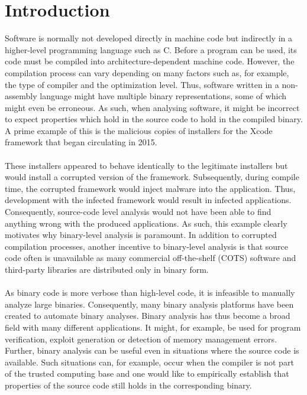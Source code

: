 \documentclass{kththesis}
\newcommand{\fbcomment}[1]{{#1}}
\renewcommand{\fbcomment}[1]{}
\begin{document}
\chapter{Introduction}
\fbcomment{\color{red}Goal: Introduce the reader to why the topic is relevant, what the problem statement is and the outline of the thesis}
Software is normally not developed directly in machine code but indirectly in a higher-level programming language such as C. Before a program can be used, its code must be compiled into architecture-dependent machine code. However, the compilation process can vary depending on many factors such as, for example, the type of compiler and the optimization level. Thus, software written in a non-assembly language might have multiple binary representations, some of which might even be erroneous\cite{preciseCFG}. As such, when analysing software, it might be incorrect to expect properties which hold in the source code to hold in the compiled binary. A prime example of this is the malicious copies of installers for the Xcode\cite{XcodeBook} framework that began circulating in 2015\cite{XcodeGhost}.
\\ \\ 
These installers appeared to behave identically to the legitimate installers but would install a corrupted version of the framework. Subsequently, during compile time, the corrupted framework would inject malware into the application. Thus, development with the infected framework would result in infected applications. Consequently, source-code level analysis would not have been able to find anything wrong with the produced applications. As such, this example clearly motivates why binary-level analysis is paramount. In addition to corrupted compilation processes, another incentive to binary-level analysis is that source code often is unavailable as many commercial off-the-shelf (COTS) software and third-party libraries are distributed only in binary form\cite{preciseCFG}.
\\ \\
As binary code is more verbose than high-level code, it is infeasible to manually analyze large binaries. Consequently, many binary analysis platforms have been created to automate binary analyses\cite{BitBlaze}\cite{BAP}\cite{TrABin}\cite{CodeSurfer}. Binary analysis has thus become a broad field with many different applications. It might, for example, be used for program verification\cite{TrABin}, exploit generation\cite{angr} or detection of memory management errors\cite{valgrind}. Further, binary analysis can be useful even in situations where the source code is available. Such situations can, for example, occur when the compiler is not part of the trusted computing base and one would like to empirically establish that properties of the source code still holds in the corresponding binary.
\end{document}
